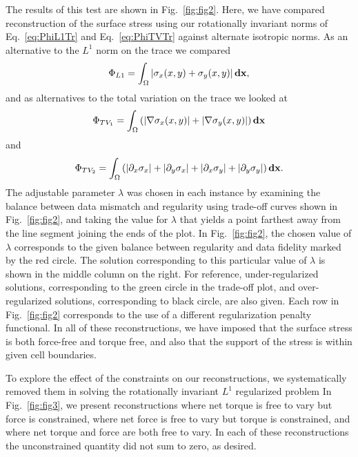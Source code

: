 \documentclass[aps,prl,reprint,twocolumn,groupedaddress,showpacs]{revtex4-1}
\def\d{{\bf d}}
\def\x{{\bf x}}
\begin{document}
The results of this test are shown in Fig.~\ref{fig:fig2}. Here, we have compared reconstruction of the surface stress using our rotationally invariant norms of Eq.~\ref{eq:PhiL1Tr} and Eq.~\ref{eq:PhiTVTr} against alternate isotropic norms. As an alternative to the $L^1$ norm on the trace we compared
\begin{equation}
\Phi_{L1} = \int_\Omega \left\vert \sigma_{x}(x,y) +\sigma_{y}(x,y) \right\vert\d\x,
\end{equation} 
and as alternatives to the total variation on the trace we looked at
 \begin{equation}
 \Phi_{TV_1} = \int_\Omega \left( \vert\nabla\sigma_{x}(x,y) \vert + \vert\nabla\sigma_{y}(x,y) \vert\right)\d\x
 \label{eq:PhiTV1}
\end{equation}
and
\begin{equation}
\Phi_{TV_2} = \int_\Omega  \left( \vert\partial_x\sigma_{x}\vert + \vert\partial_y\sigma_{x}\vert + \vert\partial_x\sigma_{y}\vert+ \vert\partial_y\sigma_{y}\vert\right)\d\x.
 \label{eq:PhiTV2}
\end{equation}
 The adjustable parameter $\lambda$ was chosen in each instance by examining the balance between data mismatch and regularity using trade-off curves shown in Fig.~\ref{fig:fig2}, and taking the value for $\lambda$ that yields a point farthest away from the line  segment joining the ends of the plot. In Fig.~\ref{fig:fig2}, the chosen value of $\lambda$ corresponds to the given balance between regularity and data fidelity marked by the red circle. The solution corresponding to this particular value of $\lambda$ is shown in the middle column on the right. For reference, under-regularized solutions, corresponding to the green  circle in the trade-off plot, and over-regularized solutions, corresponding to black circle, are also given. Each row in Fig.~\ref{fig:fig2} corresponds to the use of a different regularization penalty functional. In all of these reconstructions, we have imposed that the surface stress is both force-free and torque free, and also that the support of the stress is within given cell boundaries.

To explore the effect of the constraints on our reconstructions, we systematically removed them in solving the rotationally invariant $L^1$ regularized problem In Fig.~\ref{fig:fig3}, we present reconstructions where net torque is free to vary but force is constrained, where net force is free to vary but torque is constrained, and where net torque and force are both free to vary. In each of these reconstructions the unconstrained quantity did not sum to zero, as desired.
\end{document}
